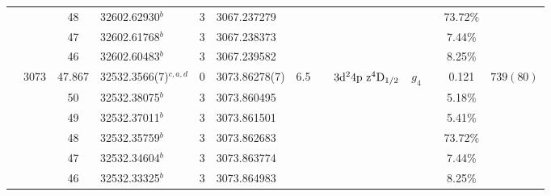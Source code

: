 \begin{table*}
\begin{center}
{\begin{tabular}{:l;l;c;l;c;l;c;l;l;c;c;c;c}
\rowstyle{\itshape}               &        & 48        & 32602.62930$^{b}$                & 3 &   3067.237279      &      & $                                        $ & $                                        $ & $      $ &              & 73.72\%   & $          $\\
\rowstyle{\itshape}               &        & 47        & 32602.61768$^{b}$                & 3 &   3067.238373      &      & $                                        $ & $                                        $ & $      $ &              & 7.44\%    & $          $\\
\rowstyle{\itshape}               &        & 46        & 32602.60483$^{b}$                & 3 &   3067.239582      &      & $                                        $ & $                                        $ & $      $ &              & 8.25\%    & $          $\\
                                  & 3073   & 47.867    & 32532.3566(7)$^{c,a,d}$          & 0 &    3073.86278(7)   &  6.5 & $                                        $ & $3\rm{d}^24\rm{p~z}^4\rm{D}_{1/2}        $ & $g_{4} $ &              & 0.121     & $  739(80) $\\
\rowstyle{\itshape}               &        & 50        & 32532.38075$^{b}$                & 3 &   3073.860495      &      & $                                        $ & $                                        $ & $      $ &              & 5.18\%    & $          $\\
\rowstyle{\itshape}               &        & 49        & 32532.37011$^{b}$                & 3 &   3073.861501      &      & $                                        $ & $                                        $ & $      $ &              & 5.41\%    & $          $\\
\rowstyle{\itshape}               &        & 48        & 32532.35759$^{b}$                & 3 &   3073.862683      &      & $                                        $ & $                                        $ & $      $ &              & 73.72\%   & $          $\\
\rowstyle{\itshape}               &        & 47        & 32532.34604$^{b}$                & 3 &   3073.863774      &      & $                                        $ & $                                        $ & $      $ &              & 7.44\%    & $          $\\
\rowstyle{\itshape}               &        & 46        & 32532.33325$^{b}$                & 3 &   3073.864983      &      & $                                        $ & $                                        $ & $      $ &              & 8.25\%    & $          $\\

\end{tabular}}
\end{center}
\end{table*}
